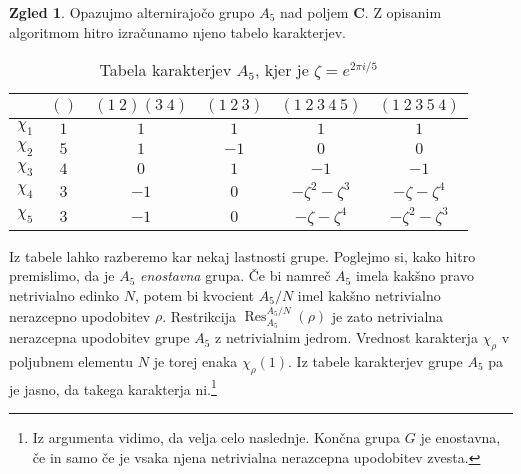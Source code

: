 \documentclass[11pt]{book}
\def\CC{\mathbf{C}}
\DeclareMathOperator\Res{Res}
\theoremstyle{definition}
\theoremstyle{zgled}
\newtheorem*{zgled}{Zgled}
\theoremstyle{odprtproblem}
\theoremstyle{domacanaloga}
\theoremstyle{izrek}
\begin{document}
\begin{zgled}
Opazujmo alternirajočo grupo $A_5$ nad poljem $\CC$. Z opisanim algoritmom hitro izračunamo njeno tabelo karakterjev.

\begin{table}[t]
    \centering
\begin{tabular}{c|ccccc}
    & $()$ & $(1 \ 2)(3 \ 4)$ & $(1 \ 2 \ 3)$ & $(1 \ 2 \ 3 \ 4 \ 5)$ & $(1 \ 2 \ 3 \ 5 \ 4)$ \\ \hline
    $\chi_1$ & $1$ & $1$ & $1$ & $1$ & $1$ \\
    $\chi_2$ & $5$ & $1$ & $-1$ & $0$ & $0$ \\
    $\chi_3$ & $4$ & $0$ & $1$ & $-1$ & $-1$ \\
    $\chi_4$ & $3$ & $-1$ & $0$ & $-\zeta^2-\zeta^3$ & $-\zeta-\zeta^4$ \\
    $\chi_5$ & $3$ & $-1$ & $0$ & $-\zeta-\zeta^4$ & $-\zeta^2-\zeta^3$ \\
\end{tabular}
\caption{Tabela karakterjev $A_5$, kjer je $\zeta = e^{2 \pi i / 5}$}
\end{table}

Iz tabele lahko razberemo kar nekaj lastnosti grupe. Poglejmo si, kako hitro premislimo, da je $A_5$ \emph{enostavna} grupa. Če bi namreč $A_5$ imela kakšno pravo netrivialno edinko $N$, potem bi kvocient $A_5/N$ imel kakšno netrivialno nerazcepno upodobitev $\rho$. Restrikcija $\Res^{A_5/N}_{A_5}(\rho)$ je zato netrivialna nerazcepna upodobitev grupe $A_5$ z netrivialnim jedrom. Vrednost karakterja $\chi_{\rho}$ v poljubnem elementu $N$ je torej enaka $\chi_{\rho}(1)$. Iz tabele karakterjev grupe $A_5$ pa je jasno, da takega karakterja ni.\footnote{Iz argumenta vidimo, da velja celo naslednje. Končna grupa $G$ je enostavna, če in samo če je vsaka njena netrivialna nerazcepna upodobitev zvesta.}
\end{zgled}
\end{document}
